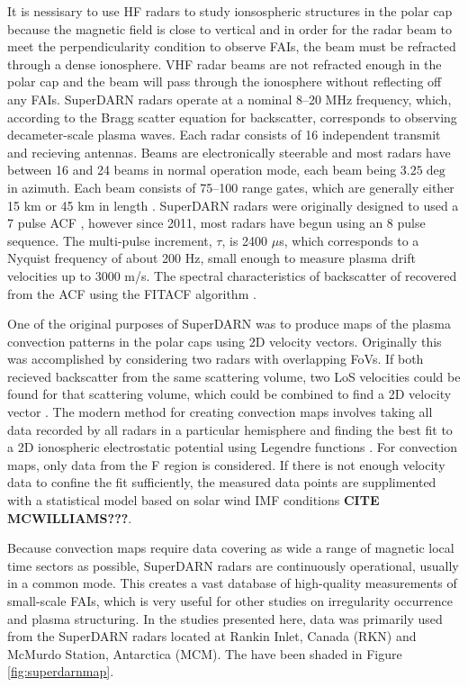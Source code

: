 It is nessisary to use HF radars to study ionsospheric structures in the polar cap because the magnetic field is close to vertical and in order for the radar beam to meet the perpendicularity condition to observe FAIs, the beam must be refracted through a dense ionosphere.  VHF radar beams are not refracted enough in the polar cap and the beam will pass through the ionosphere without reflecting off any FAIs.  SuperDARN radars operate at a nominal 8--20 MHz frequency, which, according to the Bragg scatter equation for backscatter, corresponds to observing decameter-scale plasma waves.  Each radar consists of 16 independent transmit and recieving antennas.  Beams are electronically steerable and most radars have between 16 and 24 beams in normal operation mode, each beam being \(3.25\deg\) in azimuth.  Each beam consists of 75--100 range gates, which are generally either 15 km or 45 km in length \citep{Chisham2007}.  SuperDARN radars were originally designed to used a 7 pulse ACF \citep{Farley1972,Greenwald1983,Greenwald1985}, however since 2011, most radars have begun using an 8 pulse sequence.   The multi-pulse increment, \(\tau\), is 2400 \(\mu\)s, which corresponds to a Nyquist frequency of about 200 Hz, small enough to measure plasma drift velocities up to 3000 m/s.  The spectral characteristics of backscatter of recovered from the ACF using the FITACF algorithm \citep{Ponomarenko2006}.

One of the original purposes of SuperDARN was to produce maps of the plasma convection patterns in the polar caps using 2D velocity vectors.  Originally this was accomplished by considering two radars with overlapping FoVs.  If both recieved backscatter from the same scattering volume, two LoS velocities could be found for that scattering volume, which could be combined to find a 2D velocity vector \citep{Ruohoniemi1989}.  The modern method for creating convection maps involves taking all data recorded by all radars in a particular hemisphere and finding the best fit to a 2D ionospheric electrostatic potential using Legendre functions \citep{Ruohonomiemi1998}.  For convection maps, only data from the F region is considered.  If there is not enough velocity data to confine the fit sufficiently, the measured data points are supplimented with a statistical model based on solar wind IMF conditions \textbf{CITE MCWILLIAMS???}.

Because convection maps require data covering as wide a range of magnetic local time sectors as possible, SuperDARN radars are continuously operational, usually in a common mode.  This creates a vast database of high-quality measurements of small-scale FAIs, which is very useful for other studies on irregularity occurrence and plasma structuring.  In the studies presented here, data was primarily used from the SuperDARN radars located at Rankin Inlet, Canada (RKN) and McMurdo Station, Antarctica (MCM).  The have been shaded in Figure \ref{fig:superdarnmap}.

